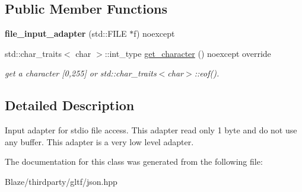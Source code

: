 \subsection*{Public Member Functions}
\begin{DoxyCompactItemize}
\item 
\mbox{\label{classnlohmann_1_1detail_1_1file__input__adapter_aeade050f2793280503be93feff2ece5b}} 
{\bfseries file\+\_\+input\+\_\+adapter} (std\+::\+F\+I\+LE $\ast$f) noexcept
\item 
\mbox{\label{classnlohmann_1_1detail_1_1file__input__adapter_a0d4ff48617c8f63c30babdfd09482329}} 
std\+::char\+\_\+traits$<$ char $>$\+::int\+\_\+type \hyperlink{classnlohmann_1_1detail_1_1file__input__adapter_a0d4ff48617c8f63c30babdfd09482329}{get\+\_\+character} () noexcept override
\begin{DoxyCompactList}\small\item\em get a character \mbox{[}0,255\mbox{]} or std\+::char\+\_\+traits$<$char$>$\+::eof(). \end{DoxyCompactList}\end{DoxyCompactItemize}


\subsection{Detailed Description}
Input adapter for stdio file access. This adapter read only 1 byte and do not use any buffer. This adapter is a very low level adapter. 

The documentation for this class was generated from the following file\+:\begin{DoxyCompactItemize}
\item 
Blaze/thirdparty/gltf/json.\+hpp\end{DoxyCompactItemize}
